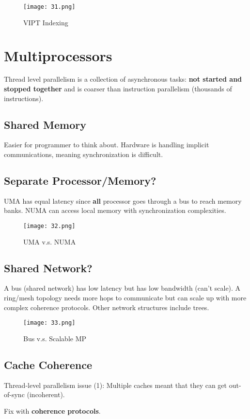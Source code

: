 \documentclass{article}
\begin{document}
\begin{multicols*}{2}
\begin{figure}[H]
    \centering
    {\texttt{[image: 31.png]}}
  \caption{VIPT Indexing}
\end{figure}

\section{Multiprocessors}
Thread level parallelism is a collection of asynchronous tasks: \textbf{not started and stopped together} and is coarser than instruction parallelism (thousands of instructions).
\subsection*{Shared Memory}
Easier for programmer to think about. Hardware is handling implicit communications, meaning synchronization is difficult.

\subsection*{Separate Processor/Memory?}
UMA has equal latency since \textbf{all} processor goes through a bus to reach memory banks. NUMA can access local memory with synchronization complexities.

\begin{figure}[H]
    \centering
    {\texttt{[image: 32.png]}}
  \caption{UMA v.s. NUMA}
\end{figure}

\subsection*{Shared Network?}
A bus (shared network) has low latency but has low bandwidth (can't scale). A ring/mesh topology needs more hops to communicate but can scale up with more complex coherence protocols. Other network structures include trees.

\begin{figure}[H]
    \centering
    {\texttt{[image: 33.png]}}
  \caption{Bus v.s. Scalable MP}
\end{figure}

\subsection*{Cache Coherence}
Thread-level parallelism issue (1): Multiple caches meant that they can get out-of-sync (incoherent).
\medskip\par\noindent
Fix with \textbf{coherence protocols}.

\end{multicols*}
\end{document}
